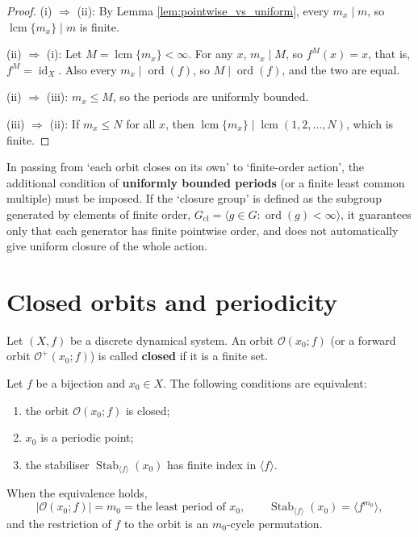 \begin{proof}
(i) $\Rightarrow$ (ii): By Lemma \ref{lem:pointwise_vs_uniform}, every $m_x\mid m$, so $\operatorname{lcm}\{m_x\}\mid m$ is finite.

(ii) $\Rightarrow$ (i): Let $M=\operatorname{lcm}\{m_x\}<\infty$. For any $x$, $m_x\mid M$, so $f^M(x)=x$, that is, $f^M=\operatorname{id}_X$. Also every $m_x\mid\operatorname{ord}(f)$, so $M\mid\operatorname{ord}(f)$, and the two are equal.

(ii) $\Rightarrow$ (iii): $m_x\le M$, so the periods are uniformly bounded.

(iii) $\Rightarrow$ (ii): If $m_x\le N$ for all $x$, then $\operatorname{lcm}\{m_x\}\mid\operatorname{lcm}(1,2,\dots,N)$, which is finite.
\end{proof}

\begin{remark}\label{rem:finite_order_caution}
In passing from `each orbit closes on its own' to `finite-order action', the additional condition of \textbf{uniformly bounded periods} (or a finite least common multiple) must be imposed. If the `closure group' is defined as the subgroup generated by elements of finite order, $G_{\mathrm{cl}}=\langle g\in G:\operatorname{ord}(g)<\infty\rangle$, it guarantees only that each generator has finite pointwise order, and does not automatically give uniform closure of the whole action.
\end{remark}

\section{Closed orbits and periodicity}

\begin{definition}\label{def:closed_orbit}
Let $(X,f)$ be a discrete dynamical system. An orbit $\mathcal{O}(x_0;f)$ (or a forward orbit $\mathcal{O}^+(x_0;f)$) is called \textbf{closed} if it is a finite set.
\end{definition}

\begin{theorem}\label{thm:closed_orbit_criterion}
Let $f$ be a bijection and $x_0\in X$. The following conditions are equivalent:
\begin{enumerate}[label=(\roman*)]
    \item the orbit $\mathcal{O}(x_0;f)$ is closed;
    \item $x_0$ is a periodic point;
    \item the stabiliser $\operatorname{Stab}_{\langle f\rangle}(x_0)$ has finite index in $\langle f\rangle$.
\end{enumerate}
When the equivalence holds,
\[
|\mathcal{O}(x_0;f)|=m_0=\text{the least period of $x_0$},
\qquad
\operatorname{Stab}_{\langle f\rangle}(x_0)=\langle f^{m_0}\rangle,
\]
and the restriction of $f$ to the orbit is an $m_0$-cycle permutation.
\end{theorem}

